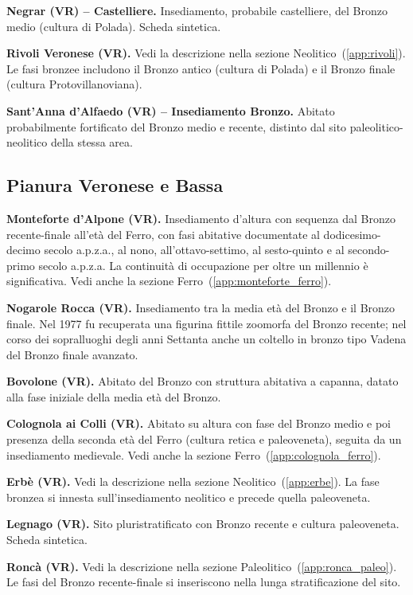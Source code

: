 \textbf{Negrar (VR) -- Castelliere.} Insediamento, probabile castelliere, del Bronzo medio (cultura di Polada). Scheda sintetica.

\textbf{Rivoli Veronese (VR).} \label{app:rivoli_bronzo} Vedi la descrizione nella sezione Neolitico~(\ref{app:rivoli}). Le fasi bronzee includono il Bronzo antico (cultura di Polada) e il Bronzo finale (cultura Protovillanoviana).

\textbf{Sant'Anna d'Alfaedo (VR) -- Insediamento Bronzo.} Abitato probabilmente fortificato del Bronzo medio e recente, distinto dal sito paleolitico-neolitico della stessa area.

\subsection{Pianura Veronese e Bassa}

\textbf{Monteforte d'Alpone (VR).} \label{app:monteforte} Insediamento d'altura con sequenza dal Bronzo recente-finale all'età del Ferro, con fasi abitative documentate al dodicesimo-decimo secolo a.p.z.a., al nono, all'ottavo-settimo, al sesto-quinto e al secondo-primo secolo a.p.z.a. La continuità di occupazione per oltre un millennio è significativa. Vedi anche la sezione Ferro~(\ref{app:monteforte_ferro}).

\textbf{Nogarole Rocca (VR).} Insediamento tra la media età del Bronzo e il Bronzo finale. Nel 1977 fu recuperata una figurina fittile zoomorfa del Bronzo recente; nel corso dei sopralluoghi degli anni Settanta anche un coltello in bronzo tipo Vadena del Bronzo finale avanzato.

\textbf{Bovolone (VR).} Abitato del Bronzo con struttura abitativa a capanna, datato alla fase iniziale della media età del Bronzo.

\textbf{Colognola ai Colli (VR).} \label{app:colognola} Abitato su altura con fase del Bronzo medio e poi presenza della seconda età del Ferro (cultura retica e paleoveneta), seguita da un insediamento medievale. Vedi anche la sezione Ferro~(\ref{app:colognola_ferro}).

\textbf{Erbè (VR).} Vedi la descrizione nella sezione Neolitico~(\ref{app:erbe}). La fase bronzea si innesta sull'insediamento neolitico e precede quella paleoveneta.

\textbf{Legnago (VR).} Sito pluristratificato con Bronzo recente e cultura paleoveneta. Scheda sintetica.

\textbf{Roncà (VR).} \label{app:ronca_bronzo} Vedi la descrizione nella sezione Paleolitico~(\ref{app:ronca_paleo}). Le fasi del Bronzo recente-finale si inseriscono nella lunga stratificazione del sito.


